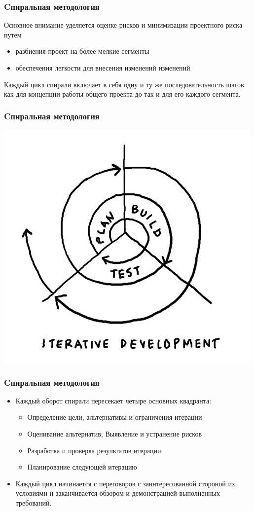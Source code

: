 \documentclass{../industrial-development}
\begin{document}
	
\begin{frame} \frametitle{Cпиральная методология}
Основное внимание уделяется \alert{оценке рисков} и \alert{минимизации проектного риска} путем
\begin{itemize}
		\item разбиения проект на более мелкие сегменты
		\item обеспечения легкости для внесения изменений изменений 
\end{itemize}		
\begin{block}{}
Каждый цикл спирали включает в себя одну и ту же последовательность шагов как для концепции работы общего проекта до так и для его каждого сегмента.
\end{block} 
\end{frame}

\begin{frame} \frametitle{Cпиральная методология}
  \centerline{\includegraphics[height=0.9\textheight]{s1.png}}
\end{frame}

\begin{frame} \frametitle{Cпиральная методология}

  \begin{itemize}
 	\item Каждый оборот спирали пересекает четыре основных квадранта:
	\begin{itemize} 
	\item Определение цели, альтернативы и ограничения итерации 
	\item Оценивание альтернатив; Выявление и устранение рисков
	\item Разработка и проверка результатов итерации
	\item Планирование следующей итерацию
	\end{itemize}
	\item Каждый цикл начинается с переговоров с заинтересованной стороной их условиями и заканчивается обзором и демонстрацией выполненных требований. 
  \end{itemize}
\end{frame}
\end{document}
